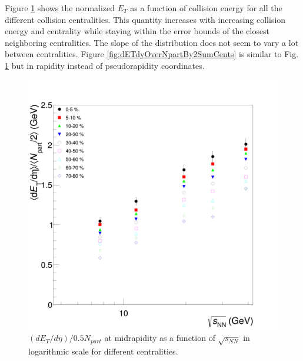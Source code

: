 Figure \ref{fig:dETdEtaOverNpartBy2SumCents} shows the normalized $E_{T}$ as a function of collision energy for all the different collision centralities. This quantity increases with increasing collision energy and centrality while staying within the error bounds of the closest neighboring centralities. The slope of the distribution does not seem to vary a lot between centralities. Figure \ref{fig:dETdyOverNpartBy2SumCents} is similar to Fig. \ref{fig:dETdEtaOverNpartBy2SumCents} but in rapidity instead of pseudorapidity coordinates.
	\begin{figure}[h]
	  \centering
	  \includegraphics[width=5.5in]{figures/finalStacked/dETdEtaOverNpartBy2SumCent8s.png}
	  \caption{$(dE_{T}/d\eta)/0.5N_{part}$ at midrapidity as a function of $\sqrt{s_{NN}}$ in logarithmic scale for different centralities.}\label{fig:dETdEtaOverNpartBy2SumCents}
	\end{figure}
	
